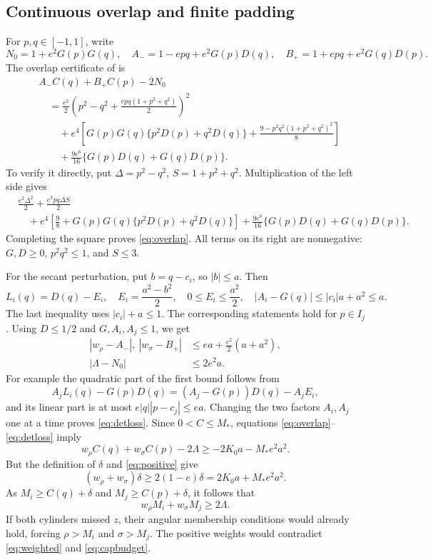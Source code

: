 \documentclass[11pt]{article}
\newcommand{\Mstar}{M_*}
\begin{document}
\subsection{Continuous overlap and finite padding}
For \(p,q\in[-1,1]\), write
\[
 N_0=1+e^2G(p)G(q),\quad A_-=1-epq+e^2G(p)D(q),\quad
 B_+=1+epq+e^2G(q)D(p).
\]
The overlap certificate of \cite{vdk-secant} is
\begin{align}
 &A_-C(q)+B_+C(p)-2N_0 \nonumber\\
 &\quad=\frac{e^2}{2}
 \left(p^2-q^2+\frac{epq(1+p^2+q^2)}2\right)^2 \nonumber\\
 &\qquad+e^4\left[
 G(p)G(q)\{p^2D(p)+q^2D(q)\}
 +\frac{9-p^2q^2(1+p^2+q^2)^2}{8}\right]\label{eq:overlap}\\
 &\qquad+\frac{9e^6}{16}\{G(p)D(q)+G(q)D(p)\}.\nonumber
\end{align}
To verify it directly, put \(\Delta=p^2-q^2\), \(S=1+p^2+q^2\).
Multiplication of the left side gives
\begin{align*}
 &\frac{e^2\Delta^2}{2}+\frac{e^3pq\Delta S}{2}\\
 &\quad+e^4\left[\frac98+G(p)G(q)\{p^2D(p)+q^2D(q)\}\right]
 +\frac{9e^6}{16}\{G(p)D(q)+G(q)D(p)\}.
\end{align*}
Completing the square proves \eqref{eq:overlap}.
All terms on its right are nonnegative:
\(G,D\ge0\), \(p^2q^2\le1\), and \(S\le3\).

For the secant perturbation, put \(b=q-c_i\), so \(|b|\le a\). Then
\[
 L_i(q)=D(q)-E_i,\quad E_i=\frac{a^2-b^2}{2},\quad
 0\le E_i\le\frac{a^2}{2},\quad
 |A_i-G(q)|\le|c_i|a+a^2\le a.
\]
The last inequality uses \(|c_i|+a\le1\). The corresponding statements
hold for \(p\in I_j\).
Using \(D\le1/2\) and \(G,A_i,A_j\le1\), we get
\begin{align}
 |w_\rho-A_-|,\ |w_\sigma-B_+|&\le ea+\frac{e^2}{2}(a+a^2),\label{eq:weightloss}\\
 |\Lambda-N_0|&\le2e^2a.\label{eq:detloss}
\end{align}
For example the quadratic part of the first bound follows from
\[
 A_jL_i(q)-G(p)D(q)=(A_j-G(p))D(q)-A_jE_i,
\]
and its linear part is at most \(e|q||p-c_j|\le ea\).
Changing the two factors \(A_i,A_j\) one at a time proves
\eqref{eq:detloss}.
Since \(0<C\le\Mstar\), equations
\eqref{eq:overlap}--\eqref{eq:detloss} imply
\[
 w_\rho C(q)+w_\sigma C(p)-2\Lambda\ge-2K_0a-\Mstar e^2a^2.
\]
But the definition of \(\delta\) and \eqref{eq:positive} give
\[
 (w_\rho+w_\sigma)\delta\ge2(1-e)\delta=2K_0a+\Mstar e^2a^2.
\]
As \(M_i\ge C(q)+\delta\) and \(M_j\ge C(p)+\delta\), it follows that
\begin{equation}\label{eq:capbudget}
 w_\rho M_i+w_\sigma M_j\ge2\Lambda.
\end{equation}
If both cylinders missed \(z\), their angular membership conditions
would already hold, forcing \(\rho>M_i\) and \(\sigma>M_j\).
The positive weights would contradict \eqref{eq:weighted}
and \eqref{eq:capbudget}.
\end{document}
